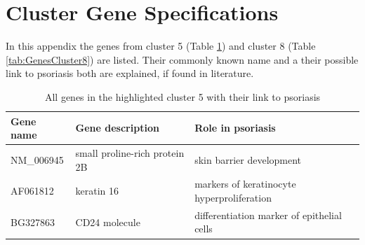 \documentclass[10pt,a4paper]{article}
\begin{document}
	\section{Cluster Gene Specifications}
	\label{app:ClusterGeneSpecifications}

In this appendix the genes from cluster 5 (Table \ref{tab:GenesCluster5}) and cluster 8 (Table \ref{tab:GenesCluster8}) are listed. Their commonly known name and a their possible link to psoriasis both are explained, if found in literature.

\begin{table}[]
	\centering
	\caption{All genes in the highlighted cluster 5 with their link to psoriasis}
	\label{tab:GenesCluster5}
	\begin{tabular}{l|p{4.5cm} p{8.5cm}}
		\textbf{Gene name} & \textbf{Gene description}                                                                                               & \textbf{Role in psoriasis}                                                                                                                                                                                                                \\ \hline
		NM\_006945         & small proline-rich protein 2B                                                                                           & skin barrier development\cite{roberson2010psoriasis}                                                                                                                                                                                                                  \\
		AF061812           & keratin 16                                                                                                              & markers of keratinocyte hyperproliferation\cite{leigh1995keratins}                                                                                                                                                                                                \\
		BG327863           & CD24 molecule                                                                                                           & differentiation marker of epithelial cells\cite{vegfors2012expression}                                                                                                                                                                                                \\

\end{tabular}
\end{table}
\end{document}
